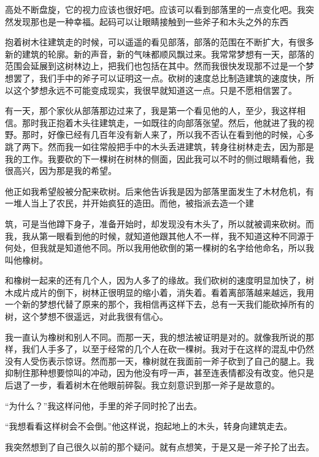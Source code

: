\documentclass{article}
\begin{document}
\newpage 

高处不断盘旋，它的视力应该也很好吧。应该可以看到部落里的一点变化吧。我突然发现那也是一种幸福。起码可以让眼睛接触到一些斧子和木头之外的东西

抱着树木往建筑走的时候，可以遥遥的看见部落，部落的范围在不断扩大，有很多新的建筑的轮廓。新的声音，新的气味都顺风飘过来。我常常梦想有一天，部落的范围会延展到这树林边上，把我们也包括在其中。然而我很快发现那不过是一个梦想罢了，我们手中的斧子可以证明这一点。砍树的速度总比制造建筑的速度快，所以这个梦想永远不可能变成现实，我很早就知道这一点。只是不愿相信罢了。


有一天，那个家伙从部落那边过来了，我是第一个看见他的人，至少，我这样相信。那时我正抱着木头往建筑走，一如既往的向部落张望。然后，他就进了我的视野。那时，好像已经有几百年没有新人来了，所以我不否认在看到他的时候，心多跳了两下。然而我一如往常般把手中的木头丢进建筑，转身往树林走去，因为那是我的工作。我要砍的下一棵树在树林的侧面，因此我可以不时的侧过眼睛看他，我很高兴，因为那是我的希望。

他正如我希望般被分配来砍树。后来他告诉我是因为部落里面发生了木材危机，有一堆人当上了农民，并开始疯狂的造田。而他，被指派去造一个建

\newpage 

筑，可是当他蹲下身子，准备开始时，却发现没有木头了，所以就被调来砍树。而我，我从第一眼看到他的时候，就知道他跟其他人不一样，我不知道这种不同源于何处，但我就是知道他不同。所以我用他砍倒的第一棵树的名字给他命名，所以我叫他橡树。

和橡树一起来的还有几个人，因为人多了的缘故。我们砍树的速度明显加快了，树木成片成片的倒下，树林正很明显的缩小着，消失着。看着离部落越来越远，我用一个新的梦想代替了原来的那个，我相信再这样下去，总有一天我们能砍掉所有的树，这个梦想不很遥远，对此我很有信心。


我一直认为橡树和别人不同。而那一天，我的想法被证明是对的。就像我所说的那样，我们人手多了，以至于经常的几个人在砍一棵树。我对于在这样的混乱中仍然没有人受伤表示惊讶。然而那一天，橡树就在我面前一斧子砍到了自己的腿上。我抑制住那种想要惊叫的冲动，因为他没有哼一声，甚至连表情都没有改变。他只是后退了一步，看着树木在他眼前碎裂。我立刻意识到那一斧子是故意的。

“为什么？”我这样问他，手里的斧子同时抡了出去。

“我想看看这样树会不会倒。”他这样说，抱起地上的木头，转身向建筑走去。

\newpage 



我突然想到了自己很久以前的那个疑问。就有点想笑，于是又是一斧子抡了出去。
\end{document}
